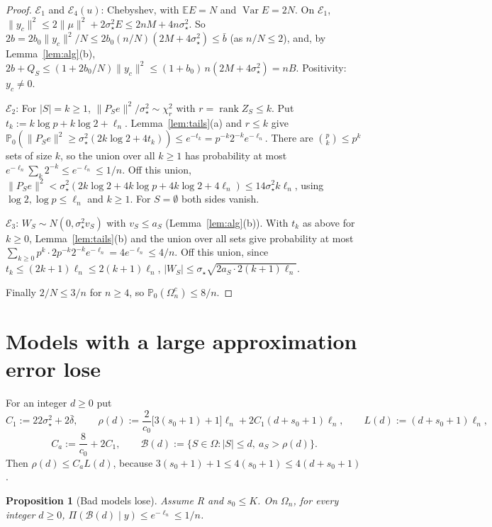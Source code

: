 \documentclass[11pt]{article}
\newtheorem{proposition}[theorem]{Proposition}
\theoremstyle{remark}
\newcommand{\E}{\mathbb E}
\renewcommand{\P}{\mathbb P}
\newcommand{\sst}{\sigma_\star}
\begin{document}
\begin{proof}
$\mathcal E_1$ and $\mathcal E_4(u)$: Chebyshev, with $\E E=N$ and $\operatorname{Var}E=2N$. On $\mathcal E_1$, $\|y_c\|^2\le2\|\mu\|^2+2\sst^2E\le2nM+4n\sst^2$. So $2b=2b_0\|y_c\|^2/N\le2b_0(n/N)(2M+4\sst^2)\le\bar b$ (as $n/N\le2$), and, by Lemma~\ref{lem:alg}(b), $2b+Q_S\le(1+2b_0/N)\|y_c\|^2\le(1+b_0)\,n(2M+4\sst^2)=nB$. Positivity: $y_c\ne0$.

$\mathcal E_2$: For $|S|=k\ge1$, $\|P_Se\|^2/\sst^2\sim\chi^2_r$ with $r=\operatorname{rank}Z_S\le k$. Put $t_k:=k\log p+k\log2+\ell_n$. Lemma~\ref{lem:tails}(a) and $r\le k$ give $\P_0(\|P_Se\|^2\ge\sst^2(2k\log2+4t_k))\le e^{-t_k}=p^{-k}2^{-k}e^{-\ell_n}$. There are $\binom pk\le p^k$ sets of size $k$, so the union over all $k\ge1$ has probability at most $e^{-\ell_n}\sum_k2^{-k}\le e^{-\ell_n}\le1/n$. Off this union, $\|P_Se\|^2<\sst^2(2k\log2+4k\log p+4k\log2+4\ell_n)\le14\sst^2k\ell_n$, using $\log2,\log p\le\ell_n$ and $k\ge1$. For $S=\emptyset$ both sides vanish.

$\mathcal E_3$: $W_S\sim N(0,\sst^2v_S)$ with $v_S\le a_S$ (Lemma~\ref{lem:alg}(b)). With $t_k$ as above for $k\ge0$, Lemma~\ref{lem:tails}(b) and the union over all sets give probability at most $\sum_{k\ge0}p^k\cdot2p^{-k}2^{-k}e^{-\ell_n}=4e^{-\ell_n}\le4/n$. Off this union, since $t_k\le(2k+1)\ell_n\le2(k+1)\ell_n$, $|W_S|\le\sst\sqrt{2a_S\cdot2(k+1)\ell_n}$.

Finally $2/N\le3/n$ for $n\ge4$, so $\P_0(\Omega_n^c)\le8/n$.
\end{proof}

\section{Models with a large approximation error lose}\label{sec:bad}

For an integer $d\ge0$ put
\[
C_1:=22\sst^2+2\bar\delta,\qquad \rho(d):=\frac2{c_0}\big[3(s_0+1)+1\big]\ell_n+2C_1(d+s_0+1)\ell_n,\qquad L(d):=(d+s_0+1)\ell_n,
\]
\[
C_a:=\frac8{c_0}+2C_1,\qquad \mathcal B(d):=\{S\in\Omega:|S|\le d,\ a_S>\rho(d)\}.
\]
Then $\rho(d)\le C_aL(d)$, because $3(s_0+1)+1\le4(s_0+1)\le4(d+s_0+1)$.

\begin{proposition}[Bad models lose]\label{prop:bad}
Assume R and $s_0\le K$. On $\Omega_n$, for every integer $d\ge0$, $\Pi(\mathcal B(d)\mid y)\le e^{-\ell_n}\le1/n$.
\end{proposition}
\end{document}
